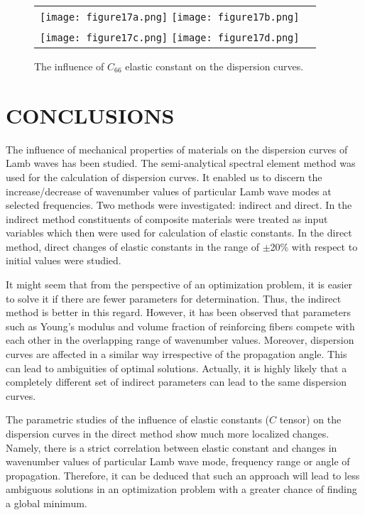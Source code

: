 \documentclass[]{spie}  %
\newcommand{\myfigscale}{0.9}
\begin{document}
\begin{figure} [ht]
	\begin{center}
		\begin{tabular}{cc} %
			\texttt{[image: figure17a.png]}
			\texttt{[image: figure17b.png]}\\
			\texttt{[image: figure17c.png]}
			\texttt{[image: figure17d.png]}
		\end{tabular}
	\end{center}
	\caption[] 
	{ \label{fig:C66} 
		The influence of \(C_{66}\) elastic constant on the dispersion curves.}
\end{figure} 
\clearpage
\section{CONCLUSIONS}
The influence of mechanical properties of materials on the dispersion curves of Lamb waves has been studied.
The semi-analytical spectral element method was used for the calculation of dispersion curves. 
It enabled us to discern the increase/decrease of wavenumber values of particular Lamb wave modes at selected frequencies.
Two methods were investigated: indirect and direct.
In the indirect method constituents of composite materials were treated as input variables which then were used for calculation of elastic constants.
In the direct method, direct changes of elastic constants in the range of \(\pm\)20\% with respect to initial values were studied.

It might seem that from the perspective of an optimization problem, it is easier to solve it if there are fewer parameters for determination. 
Thus, the indirect method is better in this regard.
 However, it has been observed that parameters such as Young's modulus and volume fraction of reinforcing fibers compete with each other in the overlapping range of wavenumber values. 
 Moreover, dispersion curves are affected in a similar way irrespective of the propagation angle.
 This can lead to ambiguities of optimal solutions. Actually, it is highly likely that a completely different set of indirect parameters can lead to the same dispersion curves.
 
 The parametric studies of the influence of elastic constants (\(C\) tensor) on the dispersion curves in the direct method show much more localized changes.
 Namely, there is a strict correlation between elastic constant and changes in wavenumber values of particular Lamb wave mode, frequency range or angle of propagation. 
 Therefore, it can be deduced that such an approach will lead to less ambiguous solutions in an optimization problem with a greater chance of finding a global minimum.
 
\end{document}
